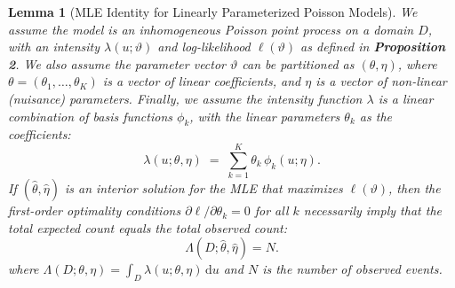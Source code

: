 \documentclass[linenum,doublespace,onecolumn]{SSA-SRL}
\theoremstyle{lemma}
\newtheorem{lemma}{Lemma}
\begin{document}
\begin{lemma}[MLE Identity for Linearly Parameterized Poisson Models]
We assume the model is an inhomogeneous Poisson point process on a domain $D$, with an intensity $\lambda(u; \vartheta)$ and log-likelihood $\ell(\vartheta)$ as defined in \textbf{Proposition 2}. We also assume the parameter vector $\vartheta$ can be partitioned as $(\theta, \eta)$, where $\theta = (\theta_1, \dots, \theta_K)$ is a vector of linear coefficients, and $\eta$ is a vector of non-linear (nuisance) parameters. Finally, we assume the intensity function $\lambda$ is a linear combination of basis functions $\phi_k$, with the linear parameters $\theta_k$ as the coefficients:
\[
\lambda(u;\theta,\eta)\;=\;\sum_{k=1}^{K}\theta_k\,\phi_k(u;\eta).
\]
If $(\hat\theta, \hat\eta)$ is an interior solution for the MLE that maximizes $\ell(\vartheta)$, then the first-order optimality conditions $\partial \ell / \partial \theta_k = 0$ for all $k$ necessarily imply that the total expected count equals the total observed count:
\[
\boxed{\;\Lambda(D;\hat\theta,\hat\eta)=N.\;}
\]
where $\Lambda(D;\theta,\eta) = \int_D \lambda(u;\theta,\eta)\,\mathrm{d}u$ and $N$ is the number of observed events.
\end{lemma}
\end{document}

